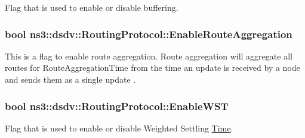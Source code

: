 Flag that is used to enable or disable buffering. 

\subsubsection[{\texorpdfstring{Enable\+Route\+Aggregation}{EnableRouteAggregation}}]{\setlength{\rightskip}{0pt plus 5cm}bool ns3\+::dsdv\+::\+Routing\+Protocol\+::\+Enable\+Route\+Aggregation\hspace{0.3cm}{\ttfamily [private]}}\hypertarget{classns3_1_1dsdv_1_1RoutingProtocol_a91fada0798359d72bfaf88bf33b1e62d}{}\label{classns3_1_1dsdv_1_1RoutingProtocol_a91fada0798359d72bfaf88bf33b1e62d}
This is a flag to enable route aggregation. Route aggregation will aggregate all routes for \textquotesingle{}Route\+Aggregation\+Time\textquotesingle{} from the time an update is received by a node and sends them as a single update . 
\subsubsection[{\texorpdfstring{Enable\+W\+ST}{EnableWST}}]{\setlength{\rightskip}{0pt plus 5cm}bool ns3\+::dsdv\+::\+Routing\+Protocol\+::\+Enable\+W\+ST\hspace{0.3cm}{\ttfamily [private]}}\hypertarget{classns3_1_1dsdv_1_1RoutingProtocol_abf3b9f8c78278e4d2faf177146359d19}{}\label{classns3_1_1dsdv_1_1RoutingProtocol_abf3b9f8c78278e4d2faf177146359d19}


Flag that is used to enable or disable Weighted Settling \hyperlink{classns3_1_1Time}{Time}. 

